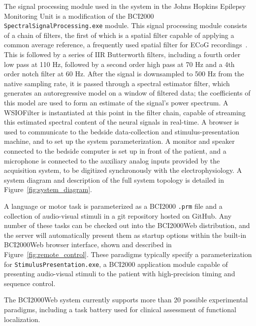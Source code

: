 \documentclass[utf8]{frontiersSCNS}
\begin{document}
The signal processing module used in the system in the Johns Hopkins Epilepsy Monitoring Unit is a modification of the BCI2000 \texttt{SpectralSignalProcessing.exe} module.
This signal processing module consists of a chain of filters, the first of which is a spatial filter capable of applying a common average reference, a frequently used spatial filter for ECoG recordings~\citep{liu_effects_2015}.
This is followed by a series of IIR Butterworth filters, including a fourth order low pass at 110 Hz, followed by a second order high pass at 70 Hz and a 4th order notch filter at 60 Hz.
After the signal is downsampled to 500 Hz from the native sampling rate, it is passed through a spectral estimator filter, which generates an autoregressive model on a window of filtered data; the coefficients of this model are used to form an estimate of the signal's power spectrum.
A WSIOFilter is instantiated at this point in the filter chain, capable of streaming this estimated spectral content of the neural signals in real-time.
A browser is used to communicate to the bedside data-collection and stimulus-presentation machine, and to set up the system parameterization.
A monitor and speaker connected to the bedside computer is set up in front of the patient, and a microphone is connected to the auxiliary analog inputs provided by the acquisition system, to be digitized synchronously with the electrophysiology.
A system diagram and description of the full system topology is detailed in Figure~\ref{fig:system_diagram}.

A language or motor task is parameterized as a BCI2000 \texttt{.prm} file and a collection of audio-visual stimuli in a git repository hosted on GitHub.
Any number of these tasks can be checked out into the BCI2000Web distribution, and the server will automatically present them as startup options within the built-in BCI2000Web browser interface, shown and described in Figure~\ref{fig:remote_control}.
These paradigms typically specify a parameterization for \texttt{StimulusPresentation.exe}, a BCI2000 application module capable of presenting audio-visual stimuli to the patient with high-precision timing and sequence control.

The BCI2000Web system currently supports more than 20 possible experimental paradigms, including a task battery used for clinical assessment of functional localization.
\end{document}
